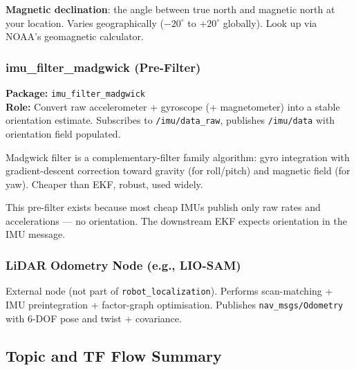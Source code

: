 \documentclass[11pt,a4paper]{article}
\begin{document}
\textbf{Magnetic declination}: the angle between true north and magnetic north at your location. Varies geographically ($-20^\circ$ to $+20^\circ$ globally). Look up via NOAA's geomagnetic calculator.

\subsubsection{imu\_filter\_madgwick (Pre-Filter)}

\textbf{Package:} \texttt{imu\_filter\_madgwick}\\
\textbf{Role:} Convert raw accelerometer + gyroscope (+ magnetometer) into a stable orientation estimate. Subscribes to \texttt{/imu/data\_raw}, publishes \texttt{/imu/data} with orientation field populated.

Madgwick filter is a complementary-filter family algorithm: gyro integration with gradient-descent correction toward gravity (for roll/pitch) and magnetic field (for yaw). Cheaper than EKF, robust, used widely.

This pre-filter exists because most cheap IMUs publish only raw rates and accelerations --- no orientation. The downstream EKF expects orientation in the IMU message.

\subsubsection{LiDAR Odometry Node (e.g., LIO-SAM)}

External node (not part of \texttt{robot\_localization}). Performs scan-matching + IMU preintegration + factor-graph optimisation. Publishes \texttt{nav\_msgs/Odometry} with 6-DOF pose and twist + covariance.

\subsection{Topic and TF Flow Summary}
\end{document}
